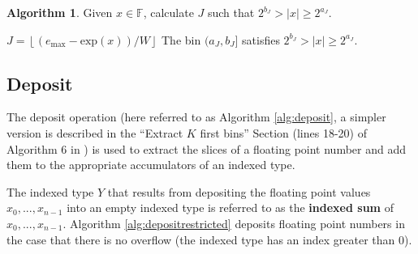 \documentclass[12pt]{article}
\providecommand{\floor}[1]{\left \lfloor #1 \right \rfloor }
\providecommand{\F}{\ensuremath{\mathbb{F}}}
\providecommand{\exp}{\ensuremath{\text{exp}}}
\providecommand{\max}{\ensuremath{\text{max}}}
\theoremstyle{definition}
\newtheorem{alg}{Algorithm}[section]
\numberwithin{equation}{section}
\numberwithin{figure}{section}
\begin{document}
    \begin{samepage}
    \begin{alg}
      Given $x \in \F$, calculate $J$ such that $2^{b_J} > |x| \geq 2^{a_J}$.
      \begin{algorithmic}[1]
          \State $J = \floor{(e_{\max} - \exp(x))/W}$
        \EndFunction
        \Ensure
          \Statex The bin $(a_{J}, b_{J}]$ satisfies $2^{b_{J}} > |x| \geq 2^{a_{J}}$.
      \end{algorithmic}
      \label{alg:index}
    \end{alg}
     \end{samepage}

  \subsection{Deposit}
    \label{sec:primitiveops_deposit}
    The deposit operation (here referred to as Algorithm \ref{alg:deposit}, a simpler version is described in the ``Extract $K$ first bins'' Section (lines 18-20) of Algorithm $6$ in \cite{repsum}) is used to extract the slices of a floating point number and add them to the appropriate accumulators of an indexed type.

    The indexed type $Y$ that results from depositing the floating point values $x_0, ..., x_{n - 1}$ into an empty indexed type is referred to as the \textbf{indexed sum} of $x_0, ..., x_{n - 1}$. Algorithm \ref{alg:depositrestricted} deposits floating point numbers in the case that there is no overflow (the indexed type has an index greater than 0).
\end{document}
